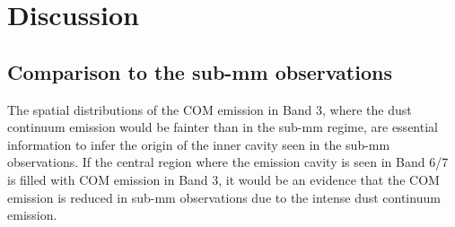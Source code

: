 \documentclass[linenumbers, twocolumn, twocolappendix, astrosymb, times]{aastex631}
\newcommand{\methanol}{CH$_3$OH\xspace}
\newcommand{\acetaldehyde}{CH$_3$CHO\xspace}
\newcommand{\methylformate}{CH$_3$OCHO\xspace}
\begin{document}





\section{Discussion} \label{sec:discussion}
\subsection{Comparison to the sub-mm observations}
The spatial distributions of the COM emission in Band 3, where the dust continuum emission would be fainter than in the sub-mm regime, are essential information to infer the origin of the inner cavity seen in the sub-mm observations. If the central region where the emission cavity is seen in Band 6/7 is filled with COM emission in Band 3, it would be an evidence that the COM emission is reduced in sub-mm observations due to the intense dust continuum emission. 
\end{document}
